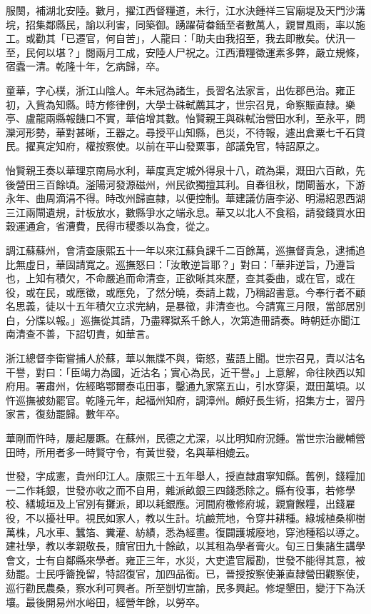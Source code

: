 \begin{pinyinscope}
服闋，補湖北安陸。數月，擢江西督糧道，未行，江水決鍾祥三官廟堤及天門沙溝垸，招集鄰縣民，諭以利害，同築御。踴躍荷畚鍤至者數萬人，親冒風雨，率以施工。或勸其「已遷官，何自苦」，人龍曰：「助夫由我招至，我去即散矣。伏汛一至，民何以堪？」閱兩月工成，安陸人尸祝之。江西漕糧徵運素多弊，嚴立規條，宿蠹一清。乾隆十年，乞病歸，卒。

童華，字心樸，浙江山陰人。年未冠為諸生，長習名法家言，出佐郡邑治。雍正初，入貲為知縣。時方修律例，大學士硃軾薦其才，世宗召見，命察賑直隸。樂亭、盧龍兩縣報饑口不實，華倍增其數。怡賢親王與硃軾治營田水利，至永平，問灤河形勢，華對甚晰，王器之。尋授平山知縣，邑災，不待報，遽出倉粟七千石貸民。擢真定知府，權按察使。以前在平山發粟事，部議免官，特詔原之。

怡賢親王奏以華理京南局水利，華度真定城外得泉十八，疏為渠，溉田六百畝，先後營田三百餘頃。滏陽河發源磁州，州民欲獨擅其利。自春徂秋，閉閘蓄水，下游永年、曲周滴涓不得。時改州歸直隸，以便控制。華建議仿唐李泌、明湯紹恩西湖三江兩閘遺規，計板放水，數縣爭水之端永息。華又以北人不食稻，請發錢買水田穀運通倉，省漕費，民得市稷黍以為食，從之。

調江蘇蘇州，會清查康熙五十一年以來江蘇負課千二百餘萬，巡撫督責急，逮捕追比無虛日，華固請寬之。巡撫怒曰：「汝敢逆旨耶？」對曰：「華非逆旨，乃遵旨也，上知有積欠，不命嚴追而命清查，正欲晰其來歷，查其委曲，或在官，或在役，或在民，或應徵，或應免，了然分曉，奏請上裁，乃稱詔書意。今奉行者不顧名思義，徒以十五年積欠立求完納，是暴徵，非清查也。今請寬三月限，當部居別白，分牒以報。」巡撫從其請，乃盡釋獄系千餘人，次第造冊請奏。時朝廷亦聞江南清查不善，下詔切責，如華言。

浙江總督李衛嘗捕人於蘇，華以無牒不與，衛怒，蜚語上聞。世宗召見，責以沽名干譽，對曰：「臣竭力為國，近沽名；實心為民，近干譽。」上意解，命往陜西以知府用。署肅州，佐經略鄂爾泰屯田事，鑿通九家窯五山，引水穿渠，溉田萬頃。以忤巡撫被劾罷官。乾隆元年，起福州知府，調漳州。頗好長生術，招集方士，習丹家言，復劾罷歸。數年卒。

華剛而忤時，屢起屢蹶。在蘇州，民德之尤深，以比明知府況鍾。當世宗治畿輔營田時，所用者多一時賢守令，有黃世發，名與華相媲云。

世發，字成憲，貴州印江人。康熙三十五年舉人，授直隸肅寧知縣。舊例，錢糧加一二作耗銀，世發亦收之而不自用，雜派畝銀三四錢悉除之。縣有役事，若修學校、繕城垣及上官別有攤派，即以耗銀應。河間府檄修府城，親齎餱糧，出錢雇役，不以擾社甲。視民如家人，教以生計。坑鹼荒地，令穿井耕種。綠城植桑柳樹萬株，凡水車、蠶箔、糞灌、紡績，悉為經畫。復闢護城廢地，穿池種稻以導之。建社學，教以孝親敬長，贖官田九十餘畝，以其租為學者膏火。旬三日集諸生講學會文，士有自鄰縣來學者。雍正三年，水災，大吏遣官履勘，世發不能得其意，被劾罷。士民呼籥挽留，特詔復官，加四品銜。已，晉授按察使兼直隸營田觀察使，巡行勸民農桑，察水利可興者。所至剴切宣諭，民多興起。修堤墾田，變汙下為沃壤。最後開易州水峪田，經營年餘，以勞卒。


\end{pinyinscope}
